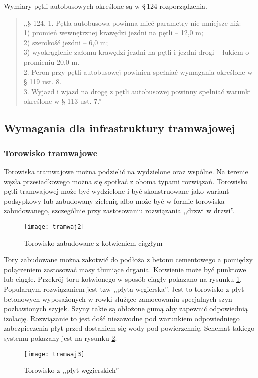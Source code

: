 \documentclass[twoside,12pt]{article}
\begin{document}
	Wymiary pętli autobusowych określone są w §\,124 rozporządzenia. 
	\begin{quote}
	,,§ 124. 1. Pętla autobusowa powinna mieć parametry nie mniejsze niż: \\
1) promień wewnętrznej krawędzi jezdni na pętli – 12,0 m; \\
2) szerokość jezdni – 6,0 m; \\
3) wyokrąglenie załomu krawędzi jezdni na pętli i jezdni drogi – łukiem o promieniu 20,0 m. \\
2. Peron przy pętli autobusowej powinien spełniać wymagania określone w § 119 ust. 8. \\
3. Wyjazd i wjazd na drogę z pętli autobusowej powinny spełniać warunki określone w § 113 ust. 7.''
	\end{quote}
	
	\clearpage
	
	\subsection{Wymagania dla infrastruktury tramwajowej}	
	
	\subsubsection{Torowisko tramwajowe}
	Torowiska tramwajowe można podzielić na wydzielone oraz wspólne. Na terenie węzła przesiadkowego można się spotkać z oboma typami rozwiązań. Torowisko pętli tramwajowej może być wydzielone i być skonstruowane jako wariant podsypkowy lub zabudowany zielenią albo może być w formie torowiska zabudowanego, szczególnie przy zastosowaniu rozwiązania ,,drzwi w drzwi''. 
	\begin{figure}[H]
		\centering
		\texttt{[image: tramwaj2]}\\
		\caption{Torowisko zabudowane z kotwieniem ciągłym}
		\label{tramwaj2}
	\end{figure}
	
	Tory zabudowane można zakotwić do podłoża z betonu cementowego a pomiędzy połączeniem zastosować masy tłumiące drgania. Kotwienie może być punktowe lub ciągłe. Przekrój toru kotwionego w sposób ciągły pokazano na rysunku \ref{tramwaj2}. Popularnym rozwiązaniem jest tzw ,,płyta węgierska''. Jest to torowisko z płyt betonowych wyposażonych w rowki służące zamocowaniu specjalnych szyn pozbawionych szyjek. Szyny takie są obłożone gumą aby zapewnić odpowiednią izolację. Rozwiązanie to jest dość niezawodne pod warunkiem odpowiedniego zabezpieczenia płyt przed dostaniem się wody pod powierzchnię. Schemat takiego systemu pokazany jest na rysunku \ref{tramwaj3}.
	\begin{figure}[H]
		\centering
		\texttt{[image: tramwaj3]}\\
		\caption{Torowisko z ,,płyt węgierskich''}
		\label{tramwaj3}
	\end{figure}
	
\end{document}
